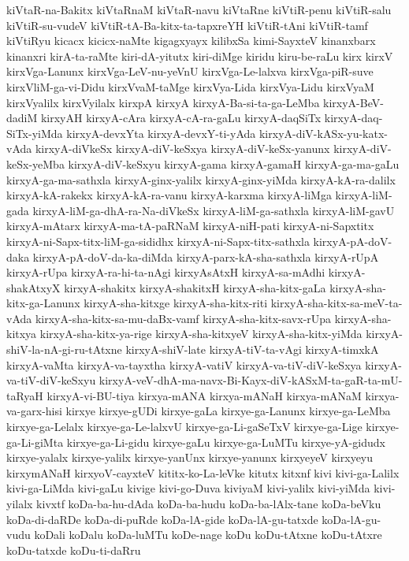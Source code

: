 {kiVtaR-na-Bakitx
kiVtaRnaM
kiVtaR-navu
kiVtaRne
kiVtiR-penu
kiVtiR-salu
kiVtiR-su-vudeV
kiVtiR-tA-Ba-kitx-ta-tapxreYH
kiVtiR-tAni
kiVtiR-tamf
kiVtiRyu
kicacx
kicicx-naMte
kigagxyayx
kilibxSa
kimi-SayxteV
kinanxbarx
kinanxri
kirA-ta-raMte
kiri-dA-yitutx
kiri-diMge
kiridu
kiru-be-raLu
kirx
kirxV
kirxVga-Lanunx
kirxVga-LeV-nu-yeVnU
kirxVga-Le-lalxva
kirxVga-piR-suve
kirxVliM-ga-vi-Didu
kirxVvaM-taMge
kirxVya-Lida
kirxVya-Lidu
kirxVyaM
kirxVyalilx
kirxVyilalx
kirxpA
kirxyA
kirxyA-Ba-si-ta-ga-LeMba
kirxyA-BeV-dadiM
kirxyAH
kirxyA-cAra
kirxyA-cA-ra-gaLu
kirxyA-daqSiTx
kirxyA-daq-SiTx-yiMda
kirxyA-devxYta
kirxyA-devxY-ti-yAda
kirxyA-diV-kASx-yu-katx-vAda
kirxyA-diVkeSx
kirxyA-diV-keSxya
kirxyA-diV-keSx-yanunx
kirxyA-diV-keSx-yeMba
kirxyA-diV-keSxyu
kirxyA-gama
kirxyA-gamaH
kirxyA-ga-ma-gaLu
kirxyA-ga-ma-sathxla
kirxyA-ginx-yalilx
kirxyA-ginx-yiMda
kirxyA-kA-ra-dalilx
kirxyA-kA-rakekx
kirxyA-kA-ra-vanu
kirxyA-karxma
kirxyA-liMga
kirxyA-liM-gada
kirxyA-liM-ga-dhA-ra-Na-diVkeSx
kirxyA-liM-ga-sathxla
kirxyA-liM-gavU
kirxyA-mAtarx
kirxyA-ma-tA-paRNaM
kirxyA-niH-pati
kirxyA-ni-Sapxtitx
kirxyA-ni-Sapx-titx-liM-ga-sididhx
kirxyA-ni-Sapx-titx-sathxla
kirxyA-pA-doV-daka
kirxyA-pA-doV-da-ka-diMda
kirxyA-parx-kA-sha-sathxla
kirxyA-rUpA
kirxyA-rUpa
kirxyA-ra-hi-ta-nAgi
kirxyAsAtxH
kirxyA-sa-mAdhi
kirxyA-shakAtxyX
kirxyA-shakitx
kirxyA-shakitxH
kirxyA-sha-kitx-gaLa
kirxyA-sha-kitx-ga-Lanunx
kirxyA-sha-kitxge
kirxyA-sha-kitx-riti
kirxyA-sha-kitx-sa-meV-ta-vAda
kirxyA-sha-kitx-sa-mu-daBx-vamf
kirxyA-sha-kitx-savx-rUpa
kirxyA-sha-kitxya
kirxyA-sha-kitx-ya-rige
kirxyA-sha-kitxyeV
kirxyA-sha-kitx-yiMda
kirxyA-shiV-la-nA-gi-ru-tAtxne
kirxyA-shiV-late
kirxyA-tiV-ta-vAgi
kirxyA-timxkA
kirxyA-vaMta
kirxyA-va-tayxtha
kirxyA-vatiV
kirxyA-va-tiV-diV-keSxya
kirxyA-va-tiV-diV-keSxyu
kirxyA-veV-dhA-ma-navx-Bi-Kayx-diV-kASxM-ta-gaR-ta-mU-taRyaH
kirxyA-vi-BU-tiya
kirxya-mANA
kirxya-mANaH
kirxya-mANaM
kirxya-va-garx-hisi
kirxye
kirxye-gUDi
kirxye-gaLa
kirxye-ga-Lanunx
kirxye-ga-LeMba
kirxye-ga-Lelalx
kirxye-ga-Le-lalxvU
kirxye-ga-Li-gaSeTxV
kirxye-ga-Lige
kirxye-ga-Li-giMta
kirxye-ga-Li-gidu
kirxye-gaLu
kirxye-ga-LuMTu
kirxye-yA-gidudx
kirxye-yalalx
kirxye-yalilx
kirxye-yanUnx
kirxye-yanunx
kirxyeyeV
kirxyeyu
kirxymANaH
kirxyoV-cayxteV
kititx-ko-La-leVke
kitutx
kitxnf
kivi
kivi-ga-Lalilx
kivi-ga-LiMda
kivi-gaLu
kivige
kivi-go-Duva
kiviyaM
kivi-yalilx
kivi-yiMda
kivi-yilalx
kivxtf
koDa-ba-hu-dAda
koDa-ba-hudu
koDa-ba-lAlx-tane
koDa-beVku
koDa-di-daRDe
koDa-di-puRde
koDa-lA-gide
koDa-lA-gu-tatxde
koDa-lA-gu-vudu
koDali
koDalu
koDa-luMTu
koDe-nage
koDu
koDu-tAtxne
koDu-tAtxre
koDu-tatxde
koDu-ti-daRru
}
